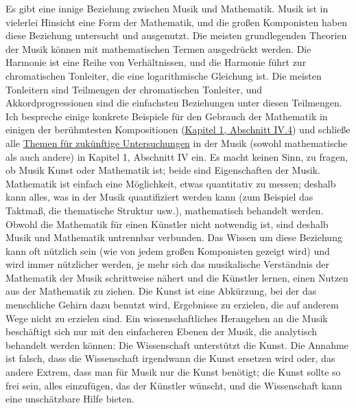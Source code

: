 Es gibt eine innige Beziehung zwischen Musik und Mathematik.
 Musik ist in vielerlei Hinsicht eine Form der Mathematik, und die großen Komponisten haben diese Beziehung untersucht und ausgenutzt.
 Die meisten grundlegenden Theorien der Musik können mit mathematischen Termen ausgedrückt werden.
 Die Harmonie ist eine Reihe von Verhältnissen, und die Harmonie führt zur chromatischen Tonleiter, die eine logarithmische Gleichung ist.
 Die meisten Tonleitern sind Teilmengen der chromatischen Tonleiter, und Akkordprogressionen sind die einfachsten Beziehungen unter diesen Teilmengen.
 Ich bespreche einige konkrete Beispiele für den Gebrauch der Mathematik in einigen der berühmtesten Kompositionen (\hyperlink{c1iv4}{Kapitel 1, Abschnitt IV.4}) und schließe alle \hyperlink{c1iv6}{Themen für zukünftige Untersuchungen} in der Musik (sowohl mathematische als auch andere) in Kapitel 1, Abschnitt IV ein.
 Es macht keinen Sinn, zu fragen, ob Musik Kunst oder Mathematik ist; beide sind Eigenschaften der Musik.
 Mathematik ist einfach eine Möglichkeit, etwas quantitativ zu messen; deshalb kann alles, was in der Musik quantifiziert werden kann (zum Beispiel das Taktmaß, die thematische Struktur usw.), mathematisch behandelt werden.
 Obwohl die Mathematik für einen Künstler nicht notwendig ist, sind deshalb Musik und Mathematik untrennbar verbunden.
 Das Wissen um diese Beziehung kann oft nützlich sein (wie von jedem großen Komponisten gezeigt wird) und wird immer nützlicher werden, je mehr sich das musikalische Verständnis der Mathematik der Musik schrittweise nähert und die Künstler lernen, einen Nutzen aus der Mathematik zu ziehen.
 Die Kunst ist eine Abkürzung, bei der das menschliche Gehirn dazu benutzt wird, Ergebnisse zu erzielen, die auf anderem Wege nicht zu erzielen sind.
 Ein wissenschaftliches Herangehen an die Musik beschäftigt sich nur mit den einfacheren Ebenen der Musik, die analytisch behandelt werden können: Die Wissenschaft unterstützt die Kunst.
 Die Annahme ist falsch, dass die Wissenschaft irgendwann die Kunst ersetzen wird oder, das andere Extrem, dass man für Musik nur die Kunst benötigt; die Kunst sollte so frei sein, alles einzufügen, das der Künstler wünscht, und die Wissenschaft kann eine unschätzbare Hilfe bieten.
 

